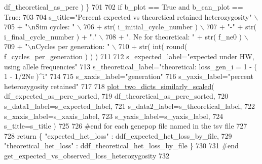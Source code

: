 \begin{DoxyCode}
      df\_theoretical\_as\_perc ) \}
701 
702         \textcolor{keywordflow}{if} b\_plot == \textcolor{keyword}{True} \textcolor{keywordflow}{and} b\_can\_plot == \textcolor{keyword}{True}:
703             
704             s\_title=\textcolor{stringliteral}{"Percent expected vs theoretical retained heterozygosity"} \(\backslash\)
705                 + \textcolor{stringliteral}{"\(\backslash\)nSim cycles: "} \(\backslash\)
706                 + str( i\_initial\_cycle\_number ) \(\backslash\)
707                 + \textcolor{stringliteral}{"-"} + str( i\_final\_cycle\_number ) + \textcolor{stringliteral}{"."} \(\backslash\)
708                 + \textcolor{stringliteral}{".  Ne for theoretical: "} + str( f\_ne0 ) \(\backslash\)
709                 + \textcolor{stringliteral}{"\(\backslash\)nCycles per generation: "} \(\backslash\)
710                 + str( int( round( f\_cycles\_per\_generation ) ) )
711 
712             s\_expected\_label=\textcolor{stringliteral}{"expected under HW, using allele frequencies"}
713             s\_theoretical\_label=\textcolor{stringliteral}{"theoretical: loss\_gen\_i =  1 - ( 1 - 1/2Ne )^i"}
714 
715             s\_xaxis\_label=\textcolor{stringliteral}{"generation"}
716             s\_yaxis\_label=\textcolor{stringliteral}{"percent heterozygosity retained"}
717                     
718             \hyperlink{namespacenegui_1_1pgvalidationtests_afbd41ca3bce1a778d97bd11efe270119}{plot\_two\_dicts\_similarly\_scaled}( df\_expected\_as\_perc\_sorted, 
719                             df\_theoretical\_as\_perc\_sorted, 
720                             s\_data1\_label=s\_expected\_label,
721                             s\_data2\_label=s\_theoretical\_label,
722                             s\_xaxis\_label=s\_xaxis\_label,
723                             s\_yaxis\_label=s\_yaxis\_label,
724                             s\_title=s\_title )
725 
726     \textcolor{comment}{#end for each genepop file named in the tsv file}
727 
728     \textcolor{keywordflow}{return} \{ \textcolor{stringliteral}{"expected\_het\_loss"} : ddf\_expected\_het\_loss\_by\_file, 
729                     \textcolor{stringliteral}{"theoretical\_het\_loss"} : ddf\_theoretical\_het\_loss\_by\_file \}
730 
731 \textcolor{comment}{#end get\_expected\_vs\_observed\_loss\_heterozygosity}
732 
\end{DoxyCode}
